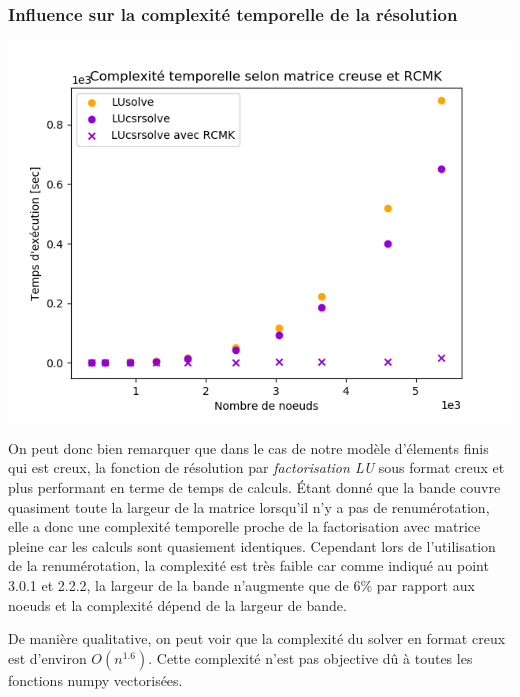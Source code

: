 \documentclass{article}[11pt]
\begin{document}
\subsubsection{Influence sur la complexité temporelle de la résolution}
\begin{minipage}{0.5\textwidth}
    \includegraphics[width=\textwidth]{res/plots/complexity.png}
\end{minipage}
\begin{minipage}{0.5\textwidth}
    On peut donc bien remarquer que dans le cas de notre modèle d'élements finis qui est creux, la fonction de résolution par \textit{factorisation LU} sous format creux et plus performant en terme de temps de calculs. Étant donné que la bande couvre quasiment toute la largeur de la matrice lorsqu'il n'y a pas de renumérotation, elle a donc une complexité temporelle proche de la factorisation avec matrice pleine car les calculs sont quasiement identiques. Cependant lors de l'utilisation de la renumérotation, la complexité est très faible car comme indiqué au point 3.0.1 et 2.2.2, la largeur de la bande n'augmente que de 6\% par rapport aux noeuds et la complexité dépend de la largeur de bande.
\end{minipage}
\begin{minipage}{0.5\textwidth}
    De manière qualitative, on peut voir que la complexité du solver  en format creux est d'environ $O(n^{1.6})$. Cette complexité n'est pas objective dû à toutes les fonctions numpy vectorisées.
\end{minipage}
\end{document}
